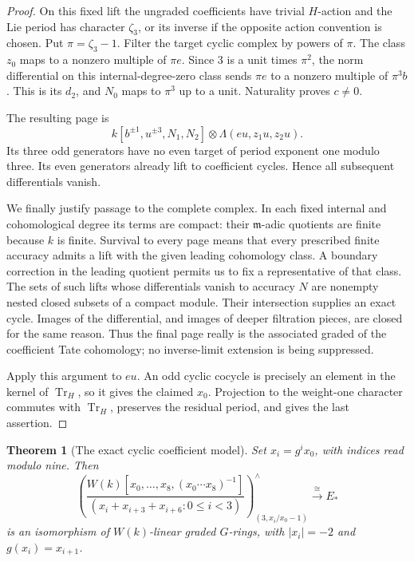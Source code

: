 \documentclass[11pt]{article}
\newtheorem{theorem}{Theorem}[section]
\theoremstyle{definition}
\theoremstyle{remark}
\numberwithin{equation}{section}
\begin{document}
\begin{proof}
On this fixed lift the ungraded coefficients have trivial \(H\)-action
and the Lie period has character \(\zeta_3\), or its inverse if the
opposite action convention is chosen.  Put \(\pi=\zeta_3-1\).
Filter the target cyclic complex by powers of \(\pi\).
The class \(z_0\) maps to a nonzero multiple of \(\pi e\).
Since \(3\) is a unit times \(\pi^2\), the norm differential on this
internal-degree-zero class sends \(\pi e\) to a nonzero multiple of
\(\pi^3b\).  This is its \(d_2\), and \(N_0\) maps to \(\pi^3\)
up to a unit.  Naturality proves \(c\ne0\).

The resulting page is
\begin{equation}\label{coef:final-graded}
 k[b^{\pm1},u^{\pm3},N_1,N_2]
       \otimes\Lambda(eu,z_1u,z_2u).
\end{equation}
Its three odd generators have no even target of period exponent one
modulo three.  Its even generators already lift to coefficient
cycles.  Hence all subsequent differentials vanish.

We finally justify passage to the complete complex.  In each fixed
internal and cohomological degree its terms are compact: their
\(\mathfrak m\)-adic quotients are finite because \(k\) is finite.
Survival to every page means that every prescribed finite accuracy
admits a lift with the given leading cohomology class.  A boundary
correction in the leading quotient permits us to fix a representative
of that class.  The sets of such lifts whose differentials vanish to
accuracy \(N\) are nonempty nested closed subsets of a compact module.
Their intersection supplies an exact cycle.  Images of the
differential, and images of deeper filtration pieces, are closed for
the same reason.  Thus the final page really is the associated
graded of the coefficient Tate cohomology; no inverse-limit
extension is being suppressed.

Apply this argument to \(eu\).  An odd cyclic cocycle is precisely an
element in the kernel of \(\operatorname{Tr}_H\), so it gives the claimed \(x_0\).
Projection to the weight-one character commutes with \(\operatorname{Tr}_H\),
preserves the residual period, and gives the last assertion.
\end{proof}

\begin{theorem}[The exact cyclic coefficient model]\label{coef:model}
Set \(x_i=g^i x_0\), with indices read modulo nine.  Then
\begin{equation}\label{coef:ring-model}
 \left(
 \frac{W(k)[x_0,\ldots,x_8,(x_0\cdots x_8)^{-1}]}
 {(x_i+x_{i+3}+x_{i+6}:0\le i<3)}
 \right)^{\wedge}_{(3,x_i/x_0-1)}
 \xrightarrow{\ \cong\ } E_*
\end{equation}
is an isomorphism of \(W(k)\)-linear graded \(G\)-rings, with
\(|x_i|=-2\) and \(g(x_i)=x_{i+1}\).
\end{theorem}
\end{document}
